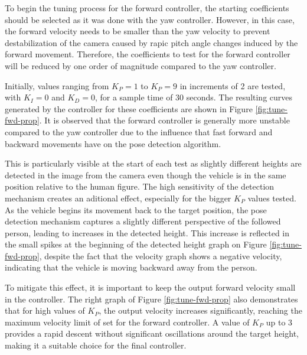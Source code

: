 To begin the tuning process for the forward controller, the starting coefficients should be selected as it was done with the yaw controller. However, in this case, the forward velocity needs to be smaller than the yaw velocity to prevent destabilization of the camera caused by rapic pitch angle changes induced by the forward movement. Therefore, the coefficients to test for the forward controller will be reduced by one order of magnitude compared to the yaw controller.

Initially, values ranging from $K_P=1$ to $K_P=9$ in increments of 2 are tested, with $K_I=0$ and $K_D=0$, for a sample time of 30 seconds. The resulting curves generated by the controller for these coefficients are shown in Figure \ref{fig:tune-fwd-prop}. It is observed that the forward controller is generally more unstable compared to the yaw controller due to the influence that fast forward and backward movements have on the pose detection algorithm.

This is particularly visible at the start of each test as slightly different heights are detected in the image from the camera even though the vehicle is in the same position relative to the human figure. The high sensitivity of the detection mechanism creates an aditional effect, especially for the bigger $K_P$ values tested. As the vehicle begins its movement back to the target position, the pose detection mechanism captures a slightly different perspective of the followed person, leading to increases in the detected height. This increase is reflected in the small spikes at the beginning of the detected height graph on Figure \ref{fig:tune-fwd-prop}, despite the fact that the velocity graph shows a negative velocity, indicating that the vehicle is moving backward away from the person.

To mitigate this effect, it is important to keep the output forward velocity small in the controller. The right graph of Figure \ref{fig:tune-fwd-prop} also demonstrates that for high values of $K_P$, the output velocity increases significantly, reaching the maximum velocity limit of  set for the forward controller. A value of $K_P$ up to 3 provides a rapid descent without significant oscillations around the target height, making it a suitable choice for the final controller.


